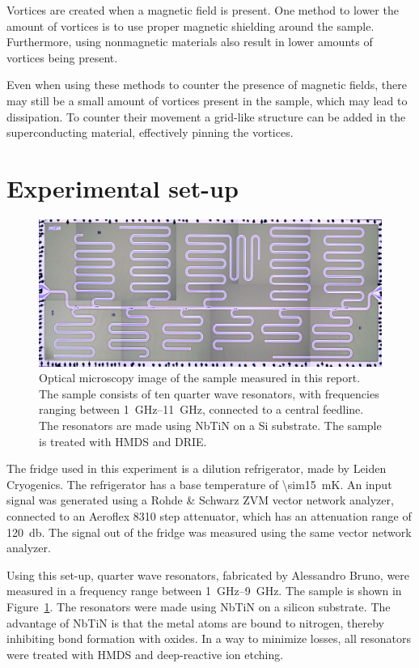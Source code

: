 Vortices are created when a magnetic field is present. One method to lower the amount of vortices is to use proper magnetic shielding around the sample. Furthermore, using nonmagnetic materials also result in lower amounts of vortices being present.

Even when using these methods to counter the presence of magnetic fields, there may still be a small amount of vortices present in the sample, which may lead to dissipation. To counter their movement a grid-like structure can be added in the superconducting material, effectively pinning the vortices.



\section{Experimental set-up}


\begin{figure}
    \begin{center}
        \includegraphics[width = .4\textwidth]{Figures/DRIE/All_set4.png}
    \end{center}
    \caption{Optical microscopy image of the sample measured in this report. The sample consists of ten quarter wave resonators, with frequencies ranging between \SIrange{1}{11}{\giga \hertz}, connected to a central feedline. The resonators are made using NbTiN on a Si substrate. The sample is treated with HMDS and DRIE.}
    \label{fig:set4}
\end{figure}

The fridge used in this experiment is a dilution refrigerator, made by Leiden Cryogenics. The refrigerator has a base temperature of \SI{\sim15}{\milli \kelvin}. An input signal was generated using a Rohde \& Schwarz ZVM vector network analyzer, connected to an Aeroflex 8310 step attenuator, which has an attenuation range of \SI{120}{\decibel}. The signal out of the fridge was measured using the same vector network analyzer.

Using this set-up, quarter wave resonators, fabricated by Alessandro Bruno, were measured in a frequency range between \SIrange{1}{9}{\giga \hertz}. The sample is shown in Figure~\ref{fig:set4}. The resonators were made using NbTiN on a silicon substrate. The advantage of NbTiN is that the metal atoms are bound to nitrogen, thereby inhibiting bond formation with oxides. In a way to minimize losses, all resonators were treated with HMDS and deep-reactive ion etching.

